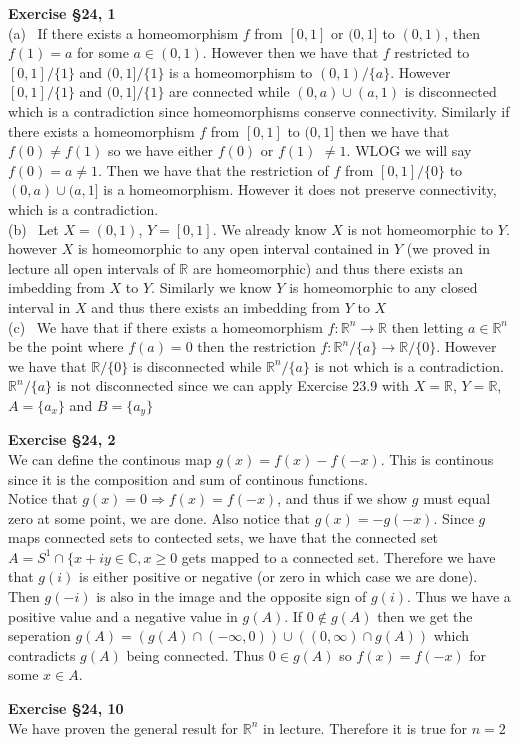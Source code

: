 \documentclass[12pt]{article}
\newenvironment{ques}[1]{\textbf{Exercise #1}\vspace{1 mm}\\ }{\bigskip}
\theoremstyle{definition}
\newcommand{\R}{\mathbb R}
\newcommand{\C}{\mathbb C}
\begin{document}
\begin{ques}{\S 24, 1}
	(a) \ If there exists a homeomorphism $f$ from  $[0,1]$ or $(0,1]$ to
	$(0,1)$, then $f(1) = a$ for some $a \in (0,1)$. However then we have that
	$f$ restricted to $[0,1] / \{1\}$ and $(0,1] / \{1\}$ is a homeomorphism to
	$(0,1) / \{a\}$. However $[0,1] / \{1\}$ and $(0,1] / \{1\}$ are connected
	while $(0,a) \cup (a,1)$ is disconnected which is a contradiction since
	homeomorphisms conserve connectivity. Similarly if there exists a
	homeomorphism $f$ from $[0,1]$ to $(0,1]$ then we have that $f(0) \neq
	f(1)$ so we have either $f(0)$ or $f(1)$ $ \neq 1$. WLOG we will say $f(0)
	= a \neq 1$. Then we have that the restriction of $f$ from $[0,1] / \{0\}$
	to $(0,a)\cup (a,1]$ is a homeomorphism. However it does not preserve
	connectivity, which is a contradiction.\\
	(b) \ Let $X = (0,1)$, $Y = [0,1]$. We already know $X$ is not homeomorphic
	to $Y$. however $X$ is homeomorphic to any open interval contained in $Y$
	(we proved in lecture all open intervals of $\R$ are homeomorphic) and thus
	there exists an imbedding from $X$ to $Y$. Similarly we know $Y$ is
	homeomorphic to any closed interval in $X$ and thus there exists an
	imbedding from $Y$ to $X$\\
	(c) \ We have that if there exists a homeomorphism $f : \R^n \to \R$ then
	letting $a \in \R^n$ be the point where $f(a) = 0$ then the restriction $f
	: \R^n / \{a\} \to \R / \{0\}$. However we have that $\R / \{0\}$ is
	disconnected while $\R^n / \{a\}$ is not which is a contradiction. $\R^n /
	\{a\}$ is not disconnected since we can apply Exercise 23.9 with $X = \R$,
	$Y = \R$, $A = \{a_x\}$ and $B = \{a_y\}$
\end{ques}

\begin{ques}{\S 24, 2}
	We can define the continous map $g(x) = f(x) - f(-x)$. This is continous
	since it is the composition and sum of continous functions.\\
	Notice that $g(x) = 0 \Rightarrow f(x) = f(-x)$, and thus if we show $g$
	must equal zero at some point, we are done. Also notice that $g(x) =
	-g(-x)$. Since $g$ maps connected sets to contected sets, we have
	that the connected set $A = S^1 \cap \{x + iy \in \C, x \geq 0$ gets mapped to
	a connected set. Therefore we have that $g(i)$ is either positive or
	negative (or zero in which case we are done). Then $g(-i)$ is also in the
	image and the opposite sign of $g(i)$. Thus we have a positive value and a
	negative value in $g(A)$. If $0 \notin g(A)$ then we get the seperation $g(A)
	= (g(A) \cap (-\infty, 0)) \cup ((0, \infty) \cap g(A))$ which contradicts
	$g(A)$ being connected. Thus $0 \in g(A)$ so $f(x) = f(-x)$ for some $x \in
	A$.
\end{ques}

\begin{ques}{\S 24, 10}
	We have proven the general result for $\R^n$ in lecture. Therefore it is
	true for $n = 2$
\end{ques}
\end{document}
